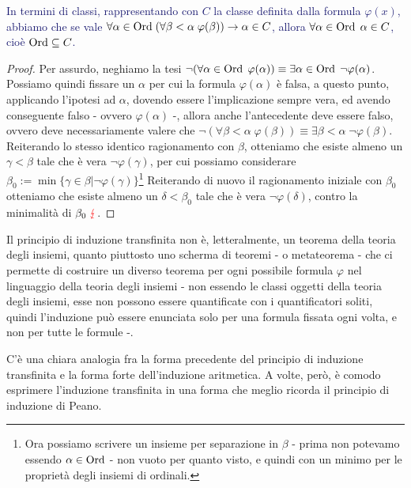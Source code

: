 \textcolor{MidnightBlue}{In termini di classi, rappresentando con $C$ la classe definita dalla formula $\varphi(x)$, abbiamo che se vale $\forall\alpha\in\operatorname{Ord} \;(\forall \beta < \alpha \; \varphi(\beta))\rightarrow \alpha \in C$,
allora $\forall \alpha \in \operatorname{Ord} \; \alpha \in C$, cioè $\operatorname{Ord} \subseteq C$.}

\begin{proof}
	Per assurdo, neghiamo la tesi $\neg(\forall \alpha \in\operatorname{Ord}\;\varphi(\alpha)) \equiv \exists \alpha \in \operatorname{Ord} \;\neg\varphi(\alpha)$. Possiamo quindi fissare un $\alpha$ per cui la formula $\varphi(\alpha)$ è falsa,
	a questo punto, applicando l'ipotesi ad $\alpha$, dovendo essere l'implicazione sempre vera, ed avendo conseguente falso - ovvero $\varphi(\alpha)$ -, allora anche l'antecedente deve essere falso, ovvero deve necessariamente valere che $\neg(\forall \beta < \alpha \; \varphi(\beta)) \equiv \exists \beta < \alpha \; \neg \varphi(\beta)$.\\
	Reiterando lo stesso identico ragionamento con $\beta$, otteniamo che esiste almeno un $\gamma < \beta$ tale che è vera $\neg \varphi(\gamma)$, per cui possiamo considerare $\beta_0 := \min\{\gamma \in \beta | \neg \varphi(\gamma)\}$\footnote{Ora possiamo scrivere un insieme per separazione in $\beta$ - prima non potevamo essendo $\alpha \in \operatorname{Ord}$ - non vuoto per quanto visto, e quindi con un minimo per le proprietà degli insiemi di ordinali.}
	Reiterando di nuovo il ragionamento iniziale con $\beta_0$ otteniamo che esiste almeno un $\delta < \beta_0$ tale che è vera $\neg\varphi(\delta)$, contro la minimalità di $\beta_0 \; \textcolor{red}\lightning$.
\end{proof}

\begin{note}
	Il principio di induzione transfinita non è, letteralmente, un teorema della teoria degli insiemi, quanto piuttosto uno scherma di teoremi - o metateorema - che ci permette 
	di costruire un diverso teorema per ogni possibile formula $\varphi$ nel linguaggio della teoria degli insiemi - non essendo le classi oggetti della teoria degli insiemi, esse non possono essere quantificate con i quantificatori soliti, quindi l'induzione può
	essere enunciata solo per una formula fissata ogni volta, e non per tutte le formule -.
\end{note}

C'è una chiara analogia fra la forma precedente del principio di induzione transfinita e la forma forte dell'induzione aritmetica.
A volte, però, è comodo esprimere l'induzione transfinita in una forma che meglio ricorda il principio di induzione di Peano.

